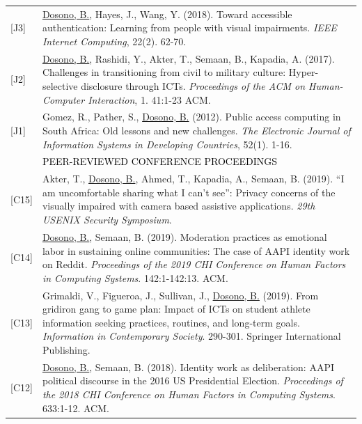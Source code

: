 \documentclass[12pt]{article}
\begin{document}
{\begin{longtable}{R{0.75in}p{5.0in}}
\footnotesize{[J3]} & \href{https://doi.org/10.1109/MIC.2018.112101619}{Dosono, B.}, Hayes, J., Wang, Y. (2018). Toward accessible authentication: Learning from people with visual impairments. \textit{IEEE Internet Computing}, 22(2). 62-70.\\

\footnotesize{[J2]} & \href{https://dl.acm.org/authorize?N42807}{Dosono, B.}, Rashidi, Y., Akter, T., Semaan, B., Kapadia, A. (2017). Challenges in transitioning from civil to military culture: Hyper-selective disclosure through ICTs. \textit{Proceedings of the ACM on Human-Computer Interaction}, 1. 41:1-23 ACM.\\

\footnotesize{[J1]} & Gomez, R., Pather, S., \href{https://doi.org/10.1002/j.1681-4835.2012.tb00366.x}{Dosono, B.} (2012). Public access computing in South Africa: Old lessons and new challenges. \textit{The Electronic Journal of Information Systems in Developing Countries}, 52(1). 1-16. \medskip \\

& \large \textcolor{black}{\uppercase{Peer-reviewed Conference Proceedings}}\\

\footnotesize{[C15]} & Akter, T., \href{https://www.usenix.org/conference/usenixsecurity20/presentation/akter}{Dosono, B.}, Ahmed, T., Kapadia, A., Semaan, B. (2019). ``I am uncomfortable sharing what I can't see'': Privacy concerns of the visually impaired with camera based assistive applications. \textit{29th {USENIX} Security Symposium}.\\

\footnotesize{[C14]} & \href{https://dl.acm.org/authorize?N680367}{Dosono, B.}, Semaan, B. (2019). Moderation practices as emotional labor in sustaining online communities: The case of AAPI identity work on Reddit. \textit{Proceedings of the 2019 CHI Conference on Human Factors in Computing Systems}. 142:1-142:13. ACM.\\

\footnotesize{[C13]} & Grimaldi, V., Figueroa, J., Sullivan, J., \href{https://doi.org/10.1007/978-3-030-15742-5_29}{Dosono, B.} (2019). From gridiron gang to game plan: Impact of ICTs on student athlete information seeking practices, routines, and long-term goals. \textit{Information in Contemporary Society}. 290-301. Springer International Publishing.\\

\footnotesize{[C12]} & \href{https://dl.acm.org/authorize?N658208}{Dosono, B.}, Semaan, B. (2018). Identity work as deliberation: AAPI political discourse in the 2016 US Presidential Election. \textit{Proceedings of the 2018 CHI Conference on Human Factors in Computing Systems}. 633:1-12. ACM.\\


\end{longtable}}
\end{document}
